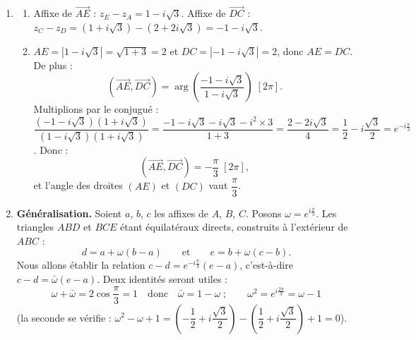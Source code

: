 \documentclass[11pt]{article}
\begin{document}
\begin{corrige}
\begin{enumerate}
\begin{enumerate}
\item Voir la figure : $D(2\,;\,2\sqrt{3})$ et $E(1\,;\,-\sqrt{3})$.
\end{enumerate}
\item \begin{enumerate}
\item Affixe de $\overrightarrow{AE}$ : $z_E - z_A = 1 - i\sqrt{3}$. Affixe de $\overrightarrow{DC}$ : $z_C - z_D = (1 + i\sqrt{3}) - (2 + 2i\sqrt{3}) = -1 - i\sqrt{3}$.
\item $AE = |1 - i\sqrt{3}| = \sqrt{1 + 3} = 2$ et $DC = |-1 - i\sqrt{3}| = 2$, donc $AE = DC$. De plus :
\[ \left(\overrightarrow{AE}, \overrightarrow{DC}\right) = \arg\left(\frac{-1 - i\sqrt{3}}{1 - i\sqrt{3}}\right)\;[2\pi]. \]
Multiplions par le conjugué : $\dfrac{(-1 - i\sqrt{3})(1 + i\sqrt{3})}{(1 - i\sqrt{3})(1 + i\sqrt{3})} = \dfrac{-1 - i\sqrt{3} - i\sqrt{3} - i^2 \times 3}{1 + 3} = \dfrac{2 - 2i\sqrt{3}}{4} = \dfrac{1}{2} - i\dfrac{\sqrt{3}}{2} = e^{-i\frac{\pi}{3}}$. Donc :
\[ \left(\overrightarrow{AE}, \overrightarrow{DC}\right) = -\frac{\pi}{3}\;[2\pi], \]
et l'angle des droites $(AE)$ et $(DC)$ vaut $\dfrac{\pi}{3}$.
\end{enumerate}
\item \textbf{Généralisation.} Soient $a$, $b$, $c$ les affixes de $A$, $B$, $C$. Posons $\omega = e^{i\frac{\pi}{3}}$. Les triangles $ABD$ et $BCE$ étant équilatéraux directs, construits à l'extérieur de $ABC$ :
\[ d = a + \omega(b - a) \qquad \text{et} \qquad e = b + \omega(c - b). \]
Nous allons établir la relation $c - d = e^{-i\frac{\pi}{3}}(e - a)$, c'est-à-dire $c - d = \bar{\omega}(e - a)$. Deux identités seront utiles :
\[ \omega + \bar{\omega} = 2\cos\frac{\pi}{3} = 1 \quad \text{donc} \quad \bar{\omega} = 1 - \omega \;; \qquad \omega^2 = e^{i\frac{2\pi}{3}} = \omega - 1 \]
(la seconde se vérifie : $\omega^2 - \omega + 1 = \left(-\dfrac{1}{2} + i\dfrac{\sqrt{3}}{2}\right) - \left(\dfrac{1}{2} + i\dfrac{\sqrt{3}}{2}\right) + 1 = 0$).


\end{enumerate}
\end{corrige}
\end{document}
